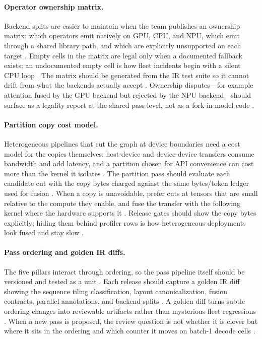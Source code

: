 \paragraph{Operator ownership matrix.}
Backend splits are easier to maintain when the team publishes an ownership matrix: which operators emit natively on GPU, CPU, and NPU, which emit through a shared library path, and which are explicitly unsupported on each target \citep{yirage2026,chen2020compilerbasedhardw,amd2024xdna}. Empty cells in the matrix are legal only when a documented fallback exists; an undocumented empty cell is how fleet incidents begin with a silent CPU loop \citep{amd2024aie,patel2025llminference,taxbreak2026}. The matrix should be generated from the IR test suite so it cannot drift from what the backends actually accept \citep{memoryfloor2026,chen2020compilerbasedhardw}. Ownership disputes---for example attention fused by the GPU backend but rejected by the NPU backend---should surface as a legality report at the shared pass level, not as a fork in model code \citep{yirage2026,amd2024aie}.

\paragraph{Partition copy cost model.}
Heterogeneous pipelines that cut the graph at device boundaries need a cost model for the copies themselves: host-device and device-device transfers consume bandwidth and add latency, and a partition chosen for API convenience can cost more than the kernel it isolates \citep{patel2025llminference,taxbreak2026,memoryfloor2026}. The partition pass should evaluate each candidate cut with the copy bytes charged against the same bytes/token ledger used for fusion \citep{chen2020compilerbasedhardw,yirage2026}. When a copy is unavoidable, prefer cuts at tensors that are small relative to the compute they enable, and fuse the transfer with the following kernel where the hardware supports it \citep{semianalysis2024tma,amd2024xdna}. Release gates should show the copy bytes explicitly; hiding them behind profiler rows is how heterogeneous deployments look fused and stay slow \citep{patel2025llminference,memoryfloor2026}.

\paragraph{Pass ordering and golden IR diffs.}
The five pillars interact through ordering, so the pass pipeline itself should be versioned and tested as a unit \citep{chen2020compilerbasedhardw,yirage2026}. Each release should capture a golden IR diff showing the sequence tiling classification, layout canonicalization, fusion contracts, parallel annotations, and backend splits \citep{memoryfloor2026,taxbreak2026}. A golden diff turns subtle ordering changes into reviewable artifacts rather than mysterious fleet regressions \citep{patel2025llminference,chen2020compilerbasedhardw}. When a new pass is proposed, the review question is not whether it is clever but where it sits in the ordering and which counter it moves on batch-1 decode cells \citep{yirage2026,taxbreak2026,memoryfloor2026}.

